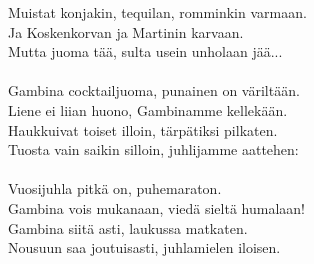 
            Muistat konjakin, tequilan, romminkin varmaan. \\
            Ja Koskenkorvan ja Martinin karvaan. \\
            Mutta juoma tää, sulta usein unholaan jää... \\
\hspace{10mm} \\
            Gambina cocktailjuoma, punainen on väriltään. \\
            Liene ei liian huono, Gambinamme kellekään. \\
            Haukkuivat toiset illoin, tärpätiksi pilkaten. \\
            Tuosta vain saikin silloin, juhlijamme aattehen: \\
\hspace{10mm} \\
            Vuosijuhla pitkä on, puhemaraton. \\
            Gambina vois mukanaan, viedä sieltä humalaan! \\
            Gambina siitä asti, laukussa matkaten. \\
            Nousuun saa joutuisasti, juhlamielen iloisen. \\
